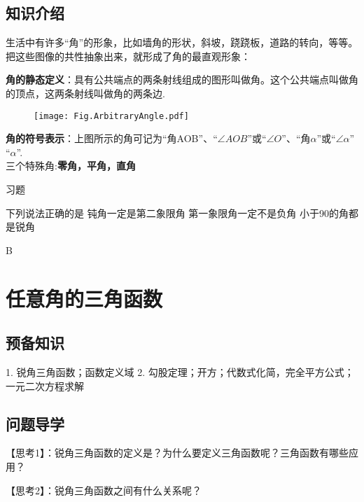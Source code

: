 \subsection{知识介绍}
生活中有许多“角”的形象，比如墙角的形状，斜坡，跷跷板，道路的转向，等等。把这些图像的共性抽象出来，就形成了角的最直观形象：\par
{\bf 角的静态定义}：具有公共端点的两条射线组成的图形叫做角。这个公共端点叫做角的顶点，这两条射线叫做角的两条边.\\
\begin{figure}[!htbp]
  \centering
  \texttt{[image: Fig.ArbitraryAngle.pdf]}
\end{figure}\par
{\bf 角的符号表示}：上图所示的角可记为“角AOB”、“$\angle{AOB}$”或“$\angle O$”、“角$\alpha$”或“$\angle\alpha$”
“$\alpha$”.\\
三个特殊角:{\bf\kaishu 零角，平角，直角}\par
\begin{exercise}{习题}
\item
下列说法正确的是\xz
{}
{钝角一定是第二象限角}
{第一象限角一定不是负角}
{小于90\textdegree 的角都是锐角}
\begin{answer}B\end{answer}
\end{exercise}

\section{任意角的三角函数}
\subsection{预备知识}
1. 锐角三角函数；函数定义域
2. 勾股定理；开方；代数式化简，完全平方公式；一元二次方程求解
\subsection{问题导学}
{\heiti 【思考1】}：锐角三角函数的定义是？为什么要定义三角函数呢？三角函数有哪些应用？\par
\vspace{12em}
{\heiti 【思考2】}：锐角三角函数之间有什么关系呢？\par
\vspace{12em}



\stoptexercise
